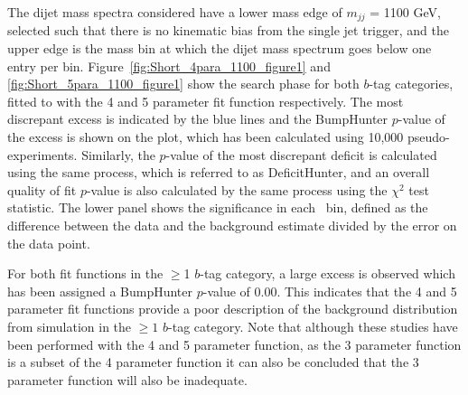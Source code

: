 The dijet mass spectra considered have a lower mass edge of $m_{jj}$ = 1100 GeV,
selected such that there is no kinematic bias from the single jet trigger,
and the upper edge is the mass bin at which the dijet mass spectrum goes below one entry per bin.
Figure~\ref{fig:Short_4para_1100_figure1} and \ref{fig:Short_5para_1100_figure1} show the search phase
for both $b$-tag categories, fitted to with the 4 and 5 parameter fit function respectively.
The most discrepant excess is indicated by the blue lines and the BumpHunter $p$-value of the excess is shown on the plot,
which has been calculated using 10,000 pseudo-experiments.
Similarly, the $p$-value of the most discrepant deficit is calculated using the same process, which is referred to as DeficitHunter,
and an overall quality of fit $p$-value is also calculated by the same process using the $\chi^{2}$ test statistic.
The lower panel shows the significance in each~\mjj{} bin,
defined as the difference between the data and the background estimate divided by the error on the data point.

For both fit functions in the $\geq$1 $b$-tag category,
a large excess is observed which has been assigned a BumpHunter $p$-value of 0.00.
This indicates that the 4 and 5 parameter fit functions
provide a poor description of the background distribution from simulation
in the $\geq1$ $b$-tag category.
Note that although these studies have been performed with the 4 and 5 parameter function,
as the 3 parameter function is a subset of the 4 parameter function it can also be concluded
that the 3 parameter function will also be inadequate.

